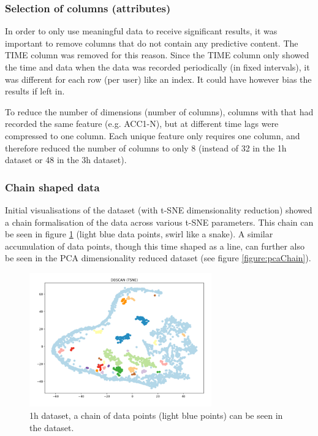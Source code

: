 \subsubsection{Selection of columns (attributes)}
In order to only use meaningful data to receive significant results, it was important to remove columns that do not contain any predictive content. The TIME column was removed for this reason. Since the TIME column only showed the time and data when the data was recorded periodically (in fixed intervals), it was different for each row (per user) like an index. It could have however bias the results if left in. 

To reduce the number of dimensions (number of columns), columns with that had recorded the same feature (e.g. ACC1-N), but at different time lags were compressed to one column. Each unique feature only requires one column, and therefore reduced the number of columns to only 8 (instead of 32 in the 1h dataset or 48 in the 3h dataset).


\subsubsection{Chain shaped data}
Initial visualisations of the dataset (with t-SNE dimensionality reduction) showed a chain formalisation of the data across various t-SNE parameters. This chain can be seen in figure \ref{figure:tsneChain} (light blue data points, swirl like a snake). A similar accumulation of data points, though this time shaped as a line, can further also be seen in the PCA dimensionality reduced dataset (see figure \ref{figure:pcaChain}). 


\begin{figure}[h]
  \centering
  \includegraphics[width=0.7\textwidth]{./images/tsneChain.png}
  \caption{1h dataset, a chain of data points (light blue points) can be seen in the dataset.}
  \label{figure:tsneChain}
\end{figure}


